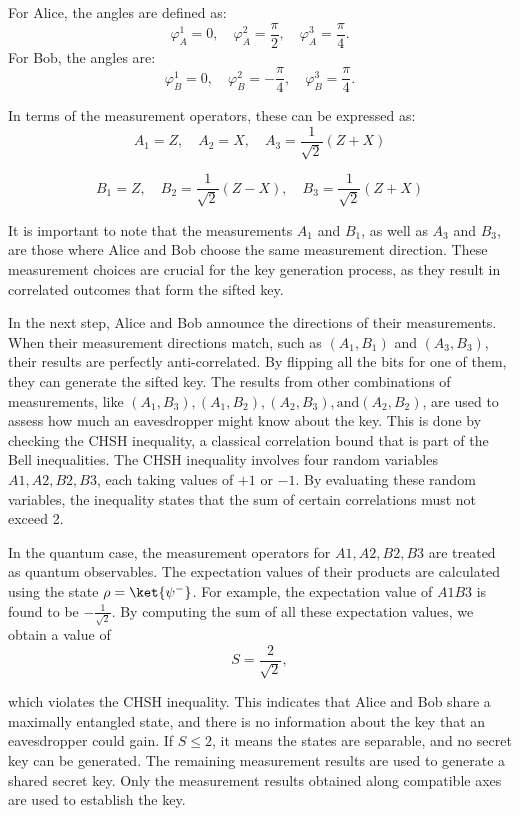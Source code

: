 \documentclass{article}
\begin{document}
For Alice, the angles are defined as:
\[
    \varphi_A^1 = 0, \quad \varphi_A^2 = \frac{\pi}{2}, \quad \varphi_A^3 = \frac{\pi}{4}.
\]
For Bob, the angles are:
\[
    \varphi_B^1 = 0, \quad \varphi_B^2 = -\frac{\pi}{4}, \quad \varphi_B^3 = \frac{\pi}{4}.
\]

In terms of the measurement operators, these can be expressed as:
\[
    A_1 = Z, \quad A_2 = X, \quad A_3 = \frac{1}{\sqrt{2}} (Z + X)\]

\[B_1 = Z, \quad B_2 = \frac{1}{\sqrt{2}} (Z - X),  \quad B_3 = \frac{1}{\sqrt{2}} (Z + X)
\]

It is important to note that the measurements $A_1$ and $B_1$, as well as $A_3$ and $B_3$, are those where Alice and Bob choose the same measurement direction. These measurement choices are crucial for the key generation process, as they result in correlated outcomes that form the sifted key.

In the next step, Alice and Bob announce the directions of their measurements. When their measurement directions match, such as $(A_1 , B_1)$ and $(A_3 , B_3)$, their results are perfectly anti-correlated. By flipping all the bits for one of them, they can generate the sifted key. The results from other combinations of measurements, like $(A_1 , B_3), (A_1 , B_2), (A_2 , B_3), \text{and} (A_2 , B_2)$, are used to assess how much an eavesdropper might know about the key. This is done by checking the CHSH inequality, a classical correlation bound that is part of the Bell inequalities. The CHSH inequality involves four random variables \( A1, A2, B2, B3 \), each taking values of \( +1 \) or \( -1 \). By evaluating these random variables, the inequality states that the sum of certain correlations must not exceed 2.

In the quantum case, the measurement operators for \( A1, A2, B2, B3 \) are treated as quantum observables. The expectation values of their products are calculated using the state \( \rho = \ket{\psi^{-}}\). For example, the expectation value of \( A1B3 \) is found to be $\displaystyle  -\frac{1}{\sqrt{2}} $. By computing the sum of all these expectation values, we obtain a value of
\[
    S = \frac{2}{\sqrt{2}},
\]

which violates the CHSH inequality. This indicates that Alice and Bob share a maximally entangled state, and there is no information about the key that an eavesdropper could gain. If \( S \leq 2 \), it means the states are separable, and no secret key can be generated.
The remaining measurement results are used to generate a shared secret key. Only the measurement results obtained along compatible axes are used to establish the key.
\end{document}
